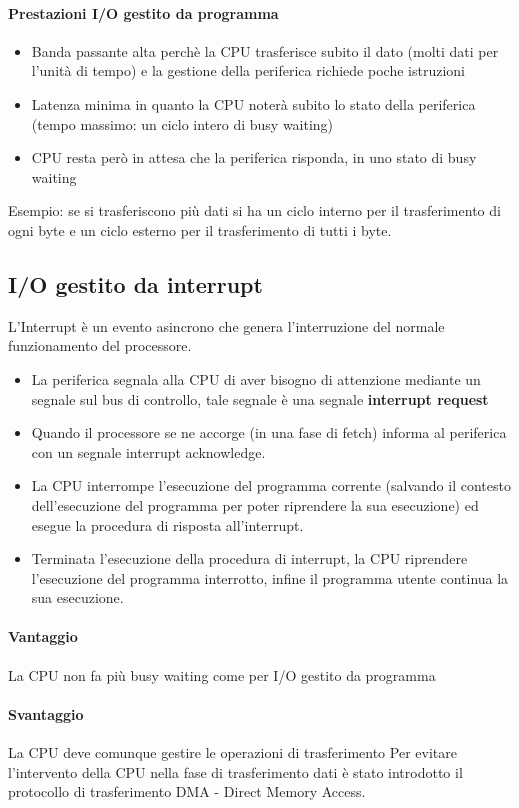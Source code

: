 \documentclass[12pt, a4paper, openany]{book}
\begin{document}
\paragraph*{Prestazioni I/O gestito da programma}
\begin{itemize}
    \item Banda passante alta perchè la CPU trasferisce subito il dato (molti dati per l'unità
    di tempo) e la gestione della periferica richiede poche istruzioni
    \item Latenza minima in quanto la CPU noterà subito lo stato della periferica (tempo massimo:
    un ciclo intero di busy waiting)
    \item CPU resta però in attesa che la periferica risponda, in uno stato di busy waiting
\end{itemize}
Esempio: se si trasferiscono più dati si ha un ciclo interno per il trasferimento di ogni byte 
e un ciclo esterno per il trasferimento di tutti i byte.

\subsection*{I/O gestito da interrupt}
L'Interrupt è un evento asincrono che genera l'interruzione del normale funzionamento del processore.
\begin{itemize}
    \item La periferica segnala alla CPU di aver bisogno di attenzione mediante un segnale sul bus di controllo,
    tale segnale è una segnale \textbf{interrupt request}
    \item Quando il processore se ne accorge (in una fase di fetch) informa al periferica con un segnale 
    interrupt acknowledge. 
    \item La CPU interrompe l'esecuzione del programma corrente (salvando il contesto dell'esecuzione del programma per poter 
    riprendere la sua esecuzione) ed esegue la procedura di risposta all'interrupt.
    \item Terminata l'esecuzione della procedura di interrupt, la CPU riprendere l'esecuzione del programma
    interrotto, infine il programma utente continua la sua esecuzione.
\end{itemize}

\paragraph*{Vantaggio} La CPU non fa più busy waiting come per I/O gestito da programma
\paragraph*{Svantaggio} La CPU deve comunque gestire le operazioni di trasferimento
Per evitare l'intervento della CPU nella fase di trasferimento dati è stato introdotto il protocollo di trasferimento
DMA - Direct Memory Access.
\end{document}
